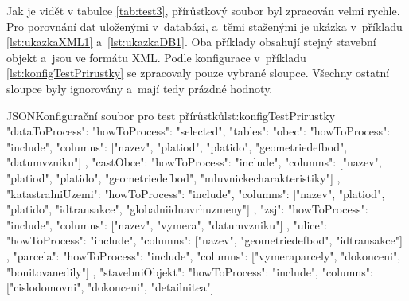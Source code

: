 Jak je vidět v tabulce \ref{tab:test3}, přírůstkový soubor byl zpracován velmi rychle.
Pro porovnání dat uloženými v~databázi, a~těmi staženými je ukázka v~příkladu 
\ref{lst:ukazkaXML1} a~\ref{lst:ukazkaDB1}.
Oba příklady obsahují stejný stavební objekt a~jsou ve formátu XML.
Podle konfigurace v~příkladu \ref{lst:konfigTestPrirustky} se zpracovaly pouze vybrané sloupce.
Všechny ostatní sloupce byly ignorovány a~mají tedy prázdné hodnoty.

\newpage

\begin{code}{JSON}{Konfigurační soubor pro test přírůstků}{lst:konfigTestPrirustky}
  {
    "dataToProcess": {
      "howToProcess": "selected",
      "tables": {
        "obec": {
          "howToProcess": "include",
          "columns": ["nazev", "platiod", "platido", "geometriedefbod", "datumvzniku"]
        },
        "castObce": {
          "howToProcess": "include",
          "columns": ["nazev", "platiod", "platido", "geometriedefbod", "mluvnickecharakteristiky"]
        },
        "katastralniUzemi": {
          "howToProcess": "include",
          "columns": ["nazev", "platiod", "platido", "idtransakce", "globalniidnavrhuzmeny"]
        },
        "zsj": {
          "howToProcess": "include",
          "columns": ["nazev", "vymera", "datumvzniku"]
        },
        "ulice": {
          "howToProcess": "include",
          "columns": ["nazev", "geometriedefbod", "idtransakce"]
        },
        "parcela": {
          "howToProcess": "include",
          "columns": ["vymeraparcely", "dokonceni", "bonitovanedily"]
        },
        "stavebniObjekt": {
          "howToProcess": "include",
          "columns": ["cislodomovni", "dokonceni", "detailnitea"]
        }
      }
    }
  }
\end{code}

\newpage

